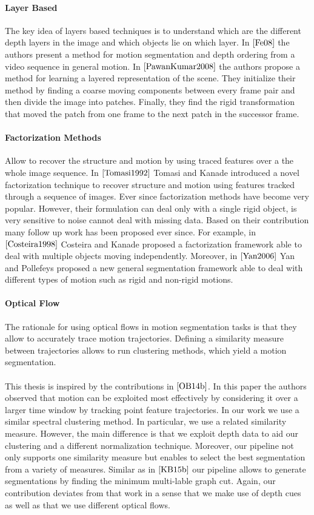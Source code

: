\paragraph{Layer Based} The key idea of layers based techniques is to understand which are the different depth layers in the image and which objects lie on which layer. In $\cite{Fe08}$ the authors present a method for motion segmentation and depth ordering from a video sequence in general motion. In $\cite{PawanKumar2008}$ the authors propose a method for learning a layered representation of the scene. They initialize their method by finding a coarse moving components between every frame pair and then divide the image into patches. Finally, they find the rigid transformation that moved the patch from one frame to the next patch in the successor frame.

\paragraph{Factorization Methods} Allow to recover the structure and motion by using traced features over a the whole image sequence. In $\cite{Tomasi1992}$ Tomasi and Kanade introduced a novel factorization technique to recover structure and motion using features tracked through a sequence of images. Ever since factorization methods have become very popular. However, their formulation can deal only with a single rigid object, is very sensitive to noise cannot deal with missing data. Based on their contribution many follow up work has been proposed ever since. For example, in $\cite{Costeira1998}$ Costeira and Kanade proposed a factorization framework able to deal with multiple objects moving independently. Moreover, in $\cite{Yan2006}$ Yan and Pollefeys proposed a new general segmentation framework able to deal with different types of motion such as rigid and non-rigid motions. 

\paragraph{Optical Flow}
The rationale for using optical flows in motion segmentation tasks is that they allow to accurately trace motion trajectories. Defining a similarity measure between trajectories allows to run clustering methods, which yield a motion segmentation. \\ \\
This thesis is inspired by the contributions in $\cite{OB14b}$. In this paper the authors observed that motion can be exploited most effectively by considering it over a larger time window by tracking point feature trajectories. In our work we use a similar spectral clustering method. In particular, we use a related similarity measure. However, the main difference is that we exploit depth data to aid our clustering and a different normalization technique. Moreover, our pipeline not only supports one similarity measure but enables to select the best segmentation from a variety of measures. Similar as in $\cite{KB15b}$ our pipeline allows to generate segmentations by finding the minimum multi-lable graph cut. Again, our contribution deviates from that work in a sense that we make use of depth cues as well as that we use different optical flows.

